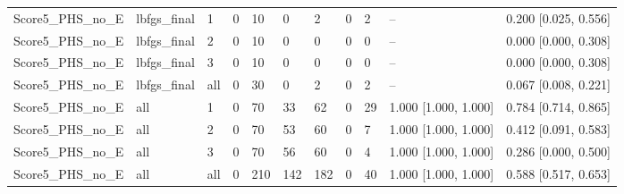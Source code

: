 \begin{longtable}{lllllllllll}
Score5\_PHS\_no\_E & lbfgs\_final & 1 & 0 & 10 & 0 & 2 & 0 & 2 & -- & 0.200 [0.025, 0.556] \\
Score5\_PHS\_no\_E & lbfgs\_final & 2 & 0 & 10 & 0 & 0 & 0 & 0 & -- & 0.000 [0.000, 0.308] \\
Score5\_PHS\_no\_E & lbfgs\_final & 3 & 0 & 10 & 0 & 0 & 0 & 0 & -- & 0.000 [0.000, 0.308] \\
Score5\_PHS\_no\_E & lbfgs\_final & all & 0 & 30 & 0 & 2 & 0 & 2 & -- & 0.067 [0.008, 0.221] \\
Score5\_PHS\_no\_E & all & 1 & 0 & 70 & 33 & 62 & 0 & 29 & 1.000 [1.000, 1.000] & 0.784 [0.714, 0.865] \\
Score5\_PHS\_no\_E & all & 2 & 0 & 70 & 53 & 60 & 0 & 7 & 1.000 [1.000, 1.000] & 0.412 [0.091, 0.583] \\
Score5\_PHS\_no\_E & all & 3 & 0 & 70 & 56 & 60 & 0 & 4 & 1.000 [1.000, 1.000] & 0.286 [0.000, 0.500] \\
Score5\_PHS\_no\_E & all & all & 0 & 210 & 142 & 182 & 0 & 40 & 1.000 [1.000, 1.000] & 0.588 [0.517, 0.653] \\
\end{longtable}
